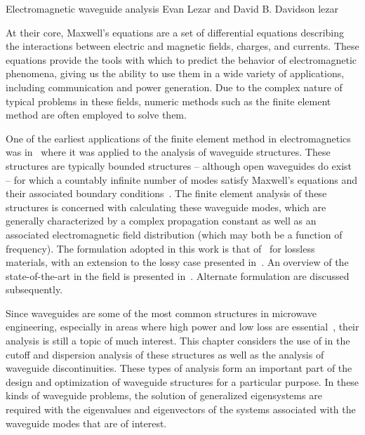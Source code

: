               {Electromagnetic waveguide analysis}
              {Evan Lezar and David B. Davidson}
              {lezar}


At their core, Maxwell's equations are
a set of differential equations describing the interactions between
electric and magnetic fields, charges, and currents. These equations
provide the tools with which to predict the behavior of electromagnetic
phenomena, giving us the ability to use them
in a wide variety of applications, including communication and power
generation. Due to the complex nature of typical problems in these fields,
numeric methods such as the finite element method are often employed to
solve them.

One of the earliest applications of the finite element method in
electromagnetics was in~\citet{Silvester1969} where it was applied to
the analysis of waveguide structures. These structures
are typically bounded structures -- although open waveguides do exist --
for which a countably infinite number of modes satisfy Maxwell's equations
and their associated boundary conditions~\citep{Pozar2005}. The finite
element analysis of these structures is concerned with calculating
these waveguide modes, which are generally characterized by a
complex propagation constant as well as an associated electromagnetic
field distribution (which may both be a function of frequency). The
formulation adopted in this work is that of~\citet{LeeSunCendes1991}
for lossless materials, with an extension to the lossy case presented
in~\citet{Lee1994}. An overview of the state-of-the-art in the field is
presented in~\citet{Davidson2011}. Alternate formulation are discussed
subsequently.

Since waveguides are some of the most common structures in microwave
engineering, especially in areas where high power and low loss are
essential~\citep{Pozar2005}, their analysis is still a topic of much
interest. This chapter considers the use of \fenics{} in the cutoff
and dispersion analysis of these structures as well as the analysis of
waveguide discontinuities. These types of analysis form an important part
of the design and optimization of waveguide structures for a particular
purpose. In these kinds of waveguide problems, the solution of generalized
eigensystems are required with the eigenvalues and eigenvectors of the
systems associated with the waveguide modes that are of interest.

